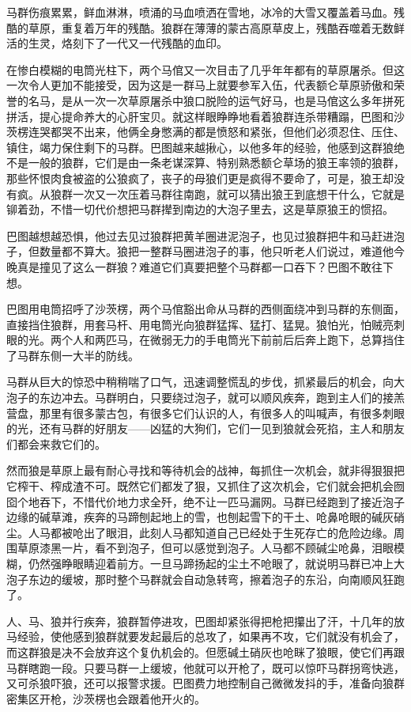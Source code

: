 \par 马群伤痕累累，鲜血淋淋，喷涌的马血喷洒在雪地，冰冷的大雪又覆盖着马血。残酷的草原，重复着万年的残酷。狼群在薄薄的蒙古高原草皮上，残酷吞噬着无数鲜活的生灵，烙刻下了一代又一代残酷的血印。
\par 在惨白模糊的电筒光柱下，两个马倌又一次目击了几乎年年都有的草原屠杀。但这一次令人更加不能接受，因为这是一群马上就要参军入伍，代表额仑草原骄傲和荣誉的名马，是从一次一次草原屠杀中狼口脱险的运气好马，也是马倌这么多年拼死拼活，提心提命养大的心肝宝贝。就这样眼睁睁地看着狼群连杀带糟蹋，巴图和沙茨楞连哭都哭不出来，他俩全身憋满的都是愤怒和紧张，但他们必须忍住、压住、镇住，竭力保住剩下的马群。巴图越来越揪心，以他多年的经验，他感到这群狼绝不是一般的狼群，它们是由一条老谋深算、特别熟悉额仑草场的狼王率领的狼群，那些怀恨肉食被盗的公狼疯了，丧子的母狼们更是疯得不要命了，可是，狼王却没有疯。从狼群一次又一次压着马群往南跑，就可以猜出狼王到底想干什么，它就是铆着劲，不惜一切代价想把马群撵到南边的大泡子里去，这是草原狼王的惯招。
\par 巴图越想越恐惧，他过去见过狼群把黄羊圈进泥泡子，也见过狼群把牛和马赶进泡子，但数量都不算大。狼把一整群马圈进泡子的事，他只听老人们说过，难道他今晚真是撞见了这么一群狼？难道它们真要把整个马群都一口吞下？巴图不敢往下想。
\par 巴图用电筒招呼了沙茨楞，两个马倌豁出命从马群的西侧面绕冲到马群的东侧面，直接挡住狼群，用套马杆、用电筒光向狼群猛挥、猛打、猛晃。狼怕光，怕贼亮刺眼的光。两个人和两匹马，在微弱无力的手电筒光下前前后后奔上跑下，总算挡住了马群东侧一大半的防线。
\par 马群从巨大的惊恐中稍稍喘了口气，迅速调整慌乱的步伐，抓紧最后的机会，向大泡子的东边冲去。马群明白，只要绕过泡子，就可以顺风疾奔，跑到主人们的接羔营盘，那里有很多蒙古包，有很多它们认识的人，有很多人的叫喊声，有很多刺眼的光，还有马群的好朋友——凶猛的大狗们，它们一见到狼就会死掐，主人和朋友们都会来救它们的。
\par 然而狼是草原上最有耐心寻找和等待机会的战神，每抓住一次机会，就非得狠狠把它榨干、榨成渣不可。既然它们都发了狠，又抓住了这次机会，它们就会把机会囫囵个地吞下，不惜代价地力求全歼，绝不让一匹马漏网。马群已经跑到了接近泡子边缘的碱草滩，疾奔的马蹄刨起地上的雪，也刨起雪下的干土、呛鼻呛眼的碱灰硝尘。人马都被呛出了眼泪，此刻人马都知道自己已经处于生死存亡的危险边缘。周围草原漆黑一片，看不到泡子，但可以感觉到泡子。人马都不顾碱尘呛鼻，泪眼模糊，仍然强睁眼睛迎着前方。一旦马蹄扬起的尘土不呛眼了，就说明马群已冲上大泡子东边的缓坡，那时整个马群就会自动急转弯，擦着泡子的东沿，向南顺风狂跑了。
\par 人、马、狼并行疾奔，狼群暂停进攻，巴图却紧张得把枪把攥出了汗，十几年的放马经验，使他感到狼群就要发起最后的总攻了，如果再不攻，它们就没有机会了，而这群狼是决不会放弃这个复仇机会的。但愿碱土硝灰也呛眯了狼眼，使它们再跟马群瞎跑一段。只要马群一上缓坡，他就可以开枪了，既可以惊吓马群拐弯快逃，又可杀狼吓狼，还可以报警求援。巴图费力地控制自己微微发抖的手，准备向狼群密集区开枪，沙茨楞也会跟着他开火的。
